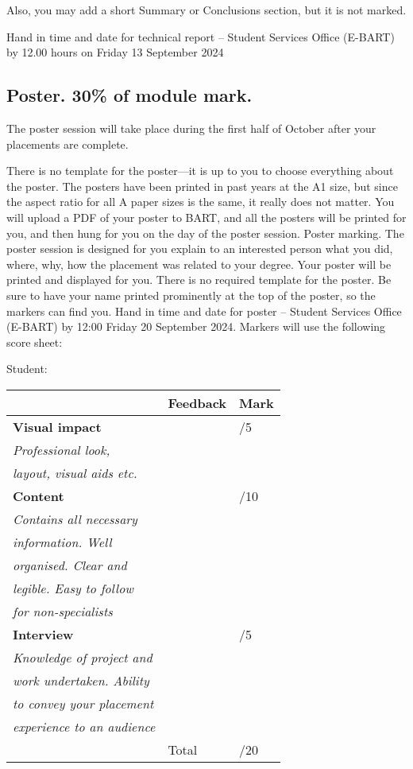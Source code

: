 \documentclass[11pt]{article}
\begin{document}
Also, you may add a short Summary or Conclusions section, but it is not marked.

Hand in time and date for technical report – Student Services Office (E-BART) by 12.00 hours on Friday 13 September 2024

\subsection{Poster. 30\% of module mark.}
\label{sec:orga985f91}

The poster session will take place during the first half of October after your placements are
complete.

There is no template for the poster—it is up to you to choose everything about the poster. The
posters have been printed in past years at the A1 size, but since the aspect ratio for all A paper
sizes is the same, it really does not matter. You will upload a PDF of your poster to BART, and all
the posters will be printed for you, and then hung for you on the day of the poster session.
Poster marking. The poster session is designed for you explain to an interested person what you
did, where, why, how the placement was related to your degree. Your poster will be printed
and displayed for you. There is no required template for the poster. Be sure to have your name
printed prominently at the top of the poster, so the markers can find you.
Hand in time and date for poster – Student Services Office (E-BART) by 12:00 Friday 20
September 2024.
Markers will use the following score sheet:

Student:

\begin{center}
\begin{tabular}{lll}
 & Feedback & Mark\\[0pt]
\hline
\textbf{Visual impact} &  & /5\\[0pt]
\emph{Professional look,} &  & \\[0pt]
\emph{layout, visual aids etc.} &  & \\[0pt]
\hline
\textbf{Content} &  & /10\\[0pt]
\emph{Contains all necessary} &  & \\[0pt]
\emph{information. Well} &  & \\[0pt]
\emph{organised. Clear and} &  & \\[0pt]
\emph{legible. Easy to follow} &  & \\[0pt]
\emph{for non-specialists} &  & \\[0pt]
\hline
\textbf{Interview} &  & /5\\[0pt]
\emph{Knowledge of project and} &  & \\[0pt]
\emph{work undertaken. Ability} &  & \\[0pt]
\emph{to convey  your placement} &  & \\[0pt]
\emph{experience to an audience} &  & \\[0pt]
\hline
 & Total & /20\\[0pt]
\end{tabular}
\end{center}
\end{document}
